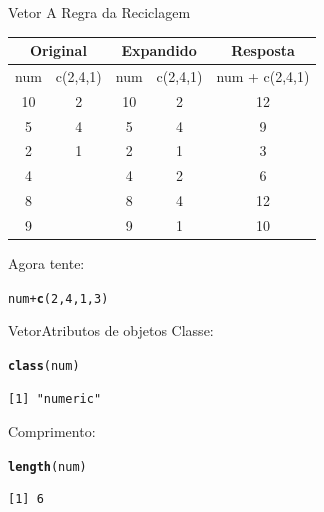 \documentclass[10pt,handout]{beamer}\usepackage[]{graphicx}\usepackage[]{color}
\makeatletter
\newcommand{\hlnum}[1]{\textcolor[rgb]{0.686,0.059,0.569}{#1}}%
\newcommand{\hlopt}[1]{\textcolor[rgb]{0,0,0}{#1}}%
\newcommand{\hlstd}[1]{\textcolor[rgb]{0.345,0.345,0.345}{#1}}%
\newcommand{\hlkwd}[1]{\textcolor[rgb]{0.282,0.239,0.545}{\textbf{#1}}}%
\newenvironment{kframe}{%
 \def\at@end@of@kframe{}%
 \ifinner\ifhmode%
  \def\at@end@of@kframe{\end{minipage}}%
  \begin{minipage}{\columnwidth}%
 \fi\fi%
 \def\FrameCommand##1{\hskip\@totalleftmargin \hskip-\fboxsep
 \colorbox{shadecolor}{##1}\hskip-\fboxsep
     \hskip-\linewidth \hskip-\@totalleftmargin \hskip\columnwidth}%
 \MakeFramed {\advance\hsize-\width
   \@totalleftmargin\z@ \linewidth\hsize
   \@setminipage}}%
 {\par\unskip\endMakeFramed%
 \at@end@of@kframe}
\newenvironment{knitrout}{}{} %
\makeatother
\begin{document}
\begin{frame}[fragile]{Vetor}
A Regra da Reciclagem
\begin{table}[htbp]
\begin{center}
\begin{tabular}{|c|c|c|c|c|c|}
\hline
\multicolumn{ 2}{|c|}{Original} & \multicolumn{ 2}{c|}{Expandido} & \multicolumn{ 2}{c|}{Resposta} \\ \hline
num & c(2,4,1) & num & c(2,4,1) & \multicolumn{ 2}{c|}{num + c(2,4,1)} \\ \hline
10 & 2 & 10 & 2 & \multicolumn{ 2}{c|}{12} \\ \hline
5 & 4 & 5 & 4 & \multicolumn{ 2}{c|}{9} \\ \hline
2 & 1 & 2 & 1 & \multicolumn{ 2}{c|}{3} \\ \hline
4 &  & 4 & 2 & \multicolumn{ 2}{c|}{6} \\ \hline
8 &  & 8 & 4 & \multicolumn{ 2}{c|}{12} \\ \hline
9 &  & 9 & 1 & \multicolumn{ 2}{c|}{10} \\ \hline
\end{tabular}
\end{center}
\end{table}
Agora tente:
\begin{knitrout}\small
{}\color{fgcolor}\begin{kframe}
\begin{alltt}
\hlstd{num} \hlopt{+} \hlkwd{c}\hlstd{(}\hlnum{2}\hlstd{,} \hlnum{4}\hlstd{,} \hlnum{1}\hlstd{,} \hlnum{3}\hlstd{)}
\end{alltt}
\end{kframe}
\end{knitrout}


\end{frame}

\begin{frame}[fragile]{Vetor}{Atributos de objetos}
Classe:
\begin{knitrout}\small
{}\color{fgcolor}\begin{kframe}
\begin{alltt}
\hlkwd{class}\hlstd{(num)}
\end{alltt}
\begin{verbatim}
[1] "numeric"
\end{verbatim}
\end{kframe}
\end{knitrout}

Comprimento:
\begin{knitrout}\small
{}\color{fgcolor}\begin{kframe}
\begin{alltt}
\hlkwd{length}\hlstd{(num)}
\end{alltt}
\begin{verbatim}
[1] 6
\end{verbatim}
\end{kframe}
\end{knitrout}

\end{frame}
\end{document}
